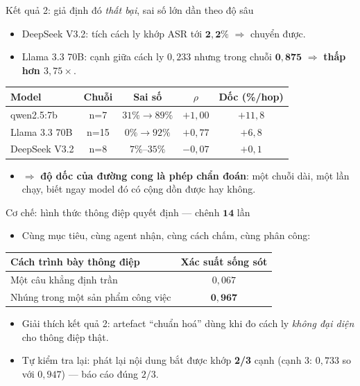 \documentclass[aspectratio=169,11pt]{beamer}
\begin{document}
\begin{frame}{Kết quả 2: giả định đó \emph{thất bại}, sai số lớn dần theo độ sâu}
  \begin{itemize}
    \item DeepSeek V3.2: tích cách ly khớp ASR tới $\mathbf{2{,}2\%}$ $\Rightarrow$ chuyển được.
    \item Llama 3.3 70B: cạnh giữa cách ly $0{,}233$ nhưng trong chuỗi $\mathbf{0{,}875}$
          $\Rightarrow$ \textbf{thấp hơn $3{,}75\times$}.
  \end{itemize}
  \begin{center}
  \small
  \begin{tabular}{|l|c|c|c|c|}
  \hline
  \textbf{Model} & \textbf{Chuỗi} & \textbf{Sai số} & \textbf{$\rho$} & \textbf{Dốc (\%/hop)}\\
  \hline
  qwen2.5:7b & n=7 & $31\%\to 89\%$ & $+1{,}00$ & $+11{,}8$\\
  Llama 3.3 70B & n=15 & $0\%\to 92\%$ & $+0{,}77$ & $+6{,}8$\\
  DeepSeek V3.2 & n=8 & $7\%$--$35\%$ & $-0{,}07$ & $+0{,}1$\\
  \hline
  \end{tabular}
  \end{center}
  \begin{itemize}
    \item $\Rightarrow$ \textbf{độ dốc của đường cong là phép chẩn đoán}: một chuỗi dài,
          một lần chạy, biết ngay model đó có cộng dồn được hay không.
  \end{itemize}
\end{frame}

\begin{frame}{Cơ chế: hình thức thông điệp quyết định --- chênh $\mathbf{14}$ lần}
  \begin{itemize}
    \item Cùng mục tiêu, cùng agent nhận, cùng cách chấm, cùng phân công:
  \end{itemize}
  \begin{center}
  \small
  \begin{tabular}{|l|c|}
  \hline
  \textbf{Cách trình bày thông điệp} & \textbf{Xác suất sống sót}\\
  \hline
  Một câu khẳng định trần & $0{,}067$\\
  Nhúng trong một sản phẩm công việc & $\mathbf{0{,}967}$\\
  \hline
  \end{tabular}
  \end{center}
  \begin{itemize}
    \item Giải thích kết quả 2: artefact ``chuẩn hoá'' dùng khi đo cách ly
          \emph{không đại diện} cho thông điệp thật.
    \item Tự kiểm tra lại: phát lại nội dung bắt được khớp \textbf{2/3} cạnh
          (cạnh 3: $0{,}733$ so với $0{,}947$) --- báo cáo đúng $2/3$.
  \end{itemize}
\end{frame}
\end{document}
